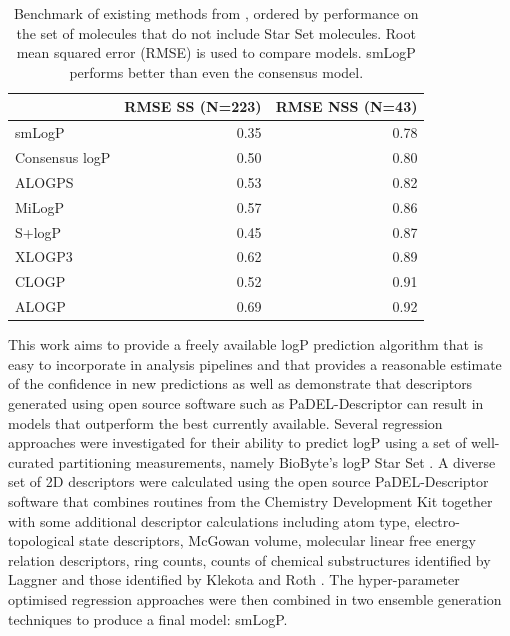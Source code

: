 \documentclass[10pt]{bmc_article}
\newenvironment{bmcformat}{\begin{raggedright}\baselineskip20pt\sloppy\setboolean{publ}{false}}{\end{raggedright}\baselineskip20pt\sloppy}
\begin{document}
\begin{bmcformat}
\begin{table}[htbp]
  \centering
  \caption{Benchmark of existing methods from \cite{mannhold_calculation_2009}, ordered by performance on the set of molecules that do not include Star Set molecules. Root mean squared error (RMSE) is used to compare models. smLogP performs better than even the consensus model.}
    \begin{tabular}{lrr}
    \toprule
          & RMSE SS (N=223) & RMSE NSS (N=43) \\
    \midrule
    smLogP & 0.35 & 0.78 \\
    Consensus logP & 0.50 & 0.80 \\
    ALOGPS  & 0.53  & 0.82 \\
    MiLogP  & 0.57  & 0.86 \\
    S+logP  & 0.45  & 0.87 \\
    XLOGP3  & 0.62  & 0.89 \\
    CLOGP  & 0.52  & 0.91 \\
    ALOGP  & 0.69  & 0.92 \\
    \bottomrule
    \end{tabular}%
  \label{tab:old_method_comp}%
\end{table}%

This work aims to provide a freely available logP prediction algorithm that is easy to incorporate in analysis pipelines and that provides a reasonable estimate of the confidence in new predictions as well as demonstrate that descriptors generated using open source software such as PaDEL-Descriptor \cite{yap_padel-descriptor:_2011} can result in models that outperform the best currently available. Several regression approaches were investigated for their ability to predict logP using a set of well-curated partitioning measurements, namely BioByte's logP Star Set \cite{leo_partition_1971}. A diverse set of 2D descriptors were calculated using the open source PaDEL-Descriptor software \cite{yap_padel-descriptor:_2011} that combines routines from the Chemistry Development Kit \cite{steinbeck_chemistry_2003} together with some additional descriptor calculations including atom type, electro-topological state descriptors, McGowan volume, molecular linear free energy relation descriptors, ring counts, counts of chemical substructures identified by Laggner \cite{laggner_2009} and those identified by Klekota and Roth \cite{klekota_chemical_2008}. The hyper-parameter optimised regression approaches were then combined in two ensemble generation techniques to produce a final model: smLogP. 


\end{bmcformat}
\end{document}
